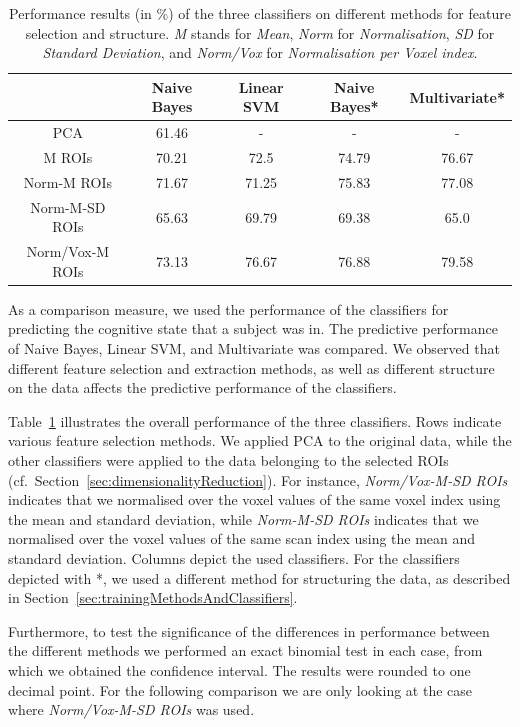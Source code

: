 \documentclass[preprint,journal,11pt]{vgtc}
\begin{document}
\begin{table}[htpb]
\centering
{\small
\begin{tabular}{c|c|c|c|c}
& \textbf{Naive Bayes} & \textbf{Linear SVM} & \textbf{Naive Bayes*} & \textbf{Multivariate*} \\ \hline
PCA & 61.46 &  - & - & - \\
M ROIs & 70.21 & 72.5 & 74.79 & 76.67 \\
Norm-M ROIs & 71.67 & 71.25 & 75.83 & 77.08 \\
Norm-M-SD ROIs & 65.63 & 69.79 & 69.38 & 65.0 \\
Norm/Vox-M ROIs & 73.13 & 76.67 & 76.88 & 79.58 \\
\end{tabular}}
\caption{Performance results (in \%) of the three classifiers on different methods for feature selection and structure. \emph{M} stands for \emph{Mean}, \emph{Norm} for \emph{Normalisation}, \emph{SD} for \emph{Standard Deviation}, and \emph{Norm/Vox} for \emph{Normalisation per Voxel index}.}
\label{tab:results}
\end{table}

As a comparison measure, we used the performance of the classifiers for predicting the cognitive state that a subject was in. The predictive performance of Naive Bayes, Linear SVM, and Multivariate was compared. We observed that different feature selection and extraction methods, as well as different structure on the data affects the predictive performance of the classifiers.

Table~\ref{tab:results} illustrates the overall performance of the three classifiers. Rows indicate various feature selection methods. We applied PCA to the original data, while the other classifiers were applied to the data belonging to the selected ROIs (cf.~Section~\ref{sec:dimensionalityReduction}). For instance, \emph{Norm/Vox-M-SD ROIs} indicates that we normalised over the voxel values of the same voxel index using the mean and standard deviation, while \emph{Norm-M-SD ROIs} indicates that we normalised over the voxel values of the same scan index using the mean and standard deviation. Columns depict the used classifiers. For the classifiers depicted with *, we used a different method for structuring the data, as described in Section~\ref{sec:trainingMethodsAndClassifiers}.

Furthermore, to test the significance of the differences in performance between the different methods we performed an exact binomial test in each case, from which we obtained the confidence interval. The results were rounded to one decimal point. For the following comparison we are only looking at the case where \emph{Norm/Vox-M-SD ROIs} was used.
\end{document}
